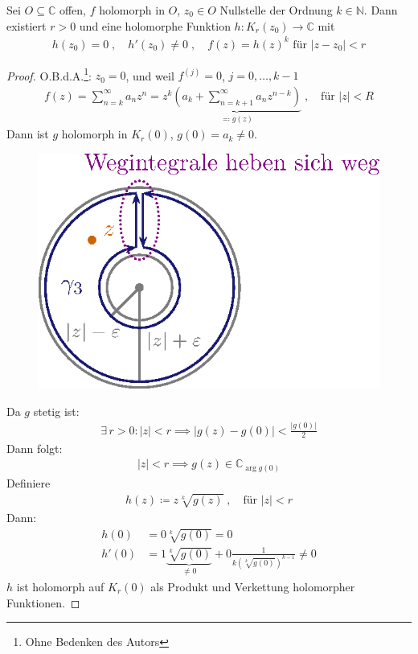 \documentclass[a4paper,10pt]{scrbook}
\begin{document}
\begin{theorem}[Satz] \label{thm:3.4}
  Sei $O \subseteq \mathbb{C}$ offen, $f$ holomorph in $O$, $z_0 \in O$ Nullstelle der Ordnung $k \in \mathbb{N}$. Dann existiert $r > 0$ und eine holomorphe Funktion $h : K_r(z_0) \to \mathbb{C}$ mit
  \begin{align*}
    h(z_0) = 0 \; , \quad h'(z_0) \neq 0 \; , \quad f(z) = h(z)^k \text{ für } |z-z_0| < r
  \end{align*}

  \begin{proof}
    O.B.d.A.\footnote{Ohne Bedenken des Autors}: $z_0 = 0$, und weil $f^{(j)}=0$, $j=0,\ldots,k-1$
    \begin{align*}
      f(z) = \sum\limits_{n=k}^{\infty} a_n z^n = z^k \underbrace{\left( a_k + \sum\limits_{n=k+1}^{\infty} a_n z^{n-k} \right)}_{\eqcolon g(z)} \; , \quad \text{für } |z| < R
    \end{align*}
    Dann ist $g$ holomorph in $K_r(0)$, $g(0) = a_k \neq 0$.

    \begin{figure}[H]
      \centering
      \includegraphics[scale=0.2]{images/ana3-tmp-25}
    \end{figure}

    Da $g$ stetig ist:
    \begin{align*}
      \exists \, r > 0 : |z| < r \implies |g(z) - g(0)| < \frac{|g(0)|}{2}
    \end{align*}
    Dann folgt:
    \begin{align*}
      |z| < r \implies g(z) \in \mathbb{C}_{\arg g(0)}
    \end{align*}
    Definiere
    \begin{align*}
      h(z) \coloneq z \sqrt[k]{g(z)} \; , \quad \text{für } |z| < r
    \end{align*}
    Dann:
    \begin{align*}
      h(0) &= 0 \sqrt[k]{g(0)} = 0 \\
      h'(0) &= 1 \underbrace{\sqrt[k]{g(0)}}_{\neq 0} + 0 \frac{1}{k (\sqrt[k]{g(0)})^{k-1}} \neq 0
    \end{align*}
    $h$ ist holomorph auf $K_r(0)$ als Produkt und Verkettung holomorpher Funktionen.
  \end{proof}
\end{theorem}
\end{document}
